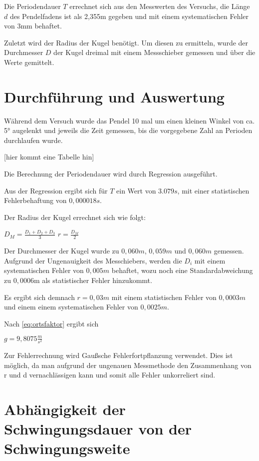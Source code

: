 Die Periodendauer $T$ errechnet sich aus den Messwerten des Versuchs, die Länge $d$ des Pendelfadens ist als 2,355m gegeben und mit einem systematischen Fehler von 3mm behaftet.

Zuletzt wird der Radius der Kugel benötigt. Um diesen zu ermitteln, wurde der Durchmesser $D$ der Kugel dreimal mit einem Messschieber gemessen und über die Werte gemittelt.

\section{Durchführung und Auswertung}

Während dem Versuch wurde das Pendel 10 mal um einen kleinen Winkel von ca. 5° augelenkt und jeweils die Zeit gemessen, bis die vorgegebene Zahl an Perioden durchlaufen wurde.

[hier kommt eine Tabelle hin]

Die Berechnung der Periodendauer wird durch Regression ausgeführt.



Aus der Regression ergibt sich für $T$ ein Wert von $3.079s$, mit einer statistischen Fehlerbehaftung von $0,000018s$.

Der Radius der Kugel errechnet sich wie folgt:

$D_M = \frac{D_1 + D_2 + D_3}{3}$
$r = \frac{D_M}{2}$

Der Durchmesser der Kugel wurde zu $0,060m$, $0,059m$ und $0,060m$ gemessen.
Aufgrund der Ungenauigkeit des Messchiebers, werden die $D_i$ mit einem systematischen Fehler von $0,005m$ behaftet, wozu noch eine Standardabweichung zu $0,0006$m als statistischer Fehler hinzukommt.

Es ergibt sich demnach $r = 0,03m$ mit einem statistischen Fehler von $0,0003m$ und einem einem systematischen Fehler von $0,0025m$.

Nach \ref{eq:ortsfaktor} ergibt sich

$g = 9,8075\frac{m}{s^2}$

Zur Fehlerrechnung wird Gaußsche Fehlerfortpflanzung verwendet. Dies ist möglich, da man aufgrund der ungenauen Messmethode den Zusammenhang von r und d vernachlässigen kann und somit alle Fehler unkorreliert sind.

\section{Abhängigkeit der Schwingungsdauer von der Schwingungsweite}


